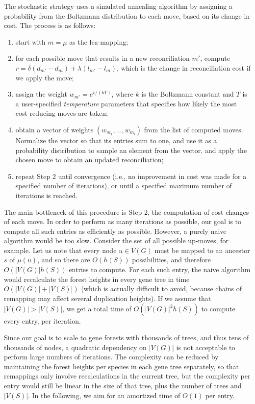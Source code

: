 \documentclass[10pt]{article}
\begin{document}
The stochastic strategy uses a simulated annealing algorithm by assigning a probability from the Boltzmann distribution to each move, based on its change in cost.  
The process is as follows:
\begin{enumerate}
    \item 
    start with $m = \mu$ as the lca-mapping;

    \item 
    for each possible move that results in a new reconciliation $m'$, compute $r = \delta (d_{m'} - d_m) + \lambda (l_{m'} - l_m)$, which is the change in reconciliation cost if we apply the move;

    \item 
    assign the weight $w_{m'} = e^{r / (kT)}$, where $k$ is the Boltzmann constant and $T$ is a user-specified \emph{temperature} parameters that specifies how likely the most cost-reducing moves are taken;

    \item 
    obtain a vector of weights $(w_{m_1}, \ldots, w_{m_l})$ from the list of computed moves.  Normalize the vector so that its entries sum to one, and use it as a probability distribution to sample an element from the vector, and apply the chosen move to obtain an updated reconciliation;

    \item 
    repeat Step 2 until convergence (i.e., no improvement in cost was made for a specified number of iterations), or until a specified maximum number of iterations is reached.
\end{enumerate}

The main bottleneck of this procedure is Step 2, the computation of cost changes of each move. 
In order to perform as many iterations as possible, our goal is to compute all such entries as efficiently as possible.  
However, a purely naive algorithm would be too slow.
Consider the set of all possible up-moves, for example.
Let us note that every node $u \in V(G)$ must be mapped to an ancestor $s$ of $\mu(u)$, and so there are $O(h(S))$ possibilities, and therefore $O(|V(G)|h(S))$ entries to compute. 
For each such entry, the naive algorithm would recalculate the forest heights in every gene tree in time $O(|V(G)| + |V(S)|)$ (which is actually difficult to avoid, because chains of remapping may affect several duplication heights).  
If we assume that $|V(G)| > |V(S)|$,  we get a total time of $O(|V(G)|^2 h(S))$ to compute every entry, per iteration.
 
Since our goal is to scale to gene forests with thousands of trees, and thus tens of thousands of nodes, a quadratic dependency on $|V(G)|$ is not acceptable to perform large numbers of iterations.  The complexity can be reduced by maintaining the forest heights per species in each gene tree separately, so that remappings only involve recalculations in the current tree, but the complexity per entry would still be linear in the size of that tree, plus the number of trees and $|V(S)|$.  In the following, we aim for an amortized time of $O(1)$ per entry.
\end{document}
